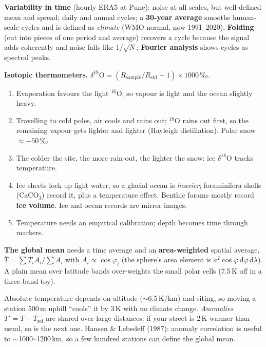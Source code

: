 \textbf{Variability in time} (hourly ERA5 at Pune): noise at all scales, but well-defined mean and spread; daily and annual
cycles; a \textbf{30-year average} smooths human-scale cycles and is defined as \emph{climate} (WMO normal, now 1991--2020).
\textbf{Folding} (cut into pieces of one period and average) recovers a cycle because the signal adds coherently and noise
falls like $1/\sqrt N$; \textbf{Fourier analysis} shows cycles as spectral peaks.

\textbf{Isotopic thermometers.} $\delta^{18}\mathrm O=(R_{\text{sample}}/R_{\text{std}}-1)\times1000$\,‰.
\begin{chain}
\begin{enumerate}
\item Evaporation favours the light $^{16}$O, so vapour is light and the ocean slightly heavy.
\item Travelling to cold poles, air cools and rains out; $^{18}$O rains out first, so the remaining vapour gets lighter and
lighter (Rayleigh distillation). Polar snow $\approx-50$\,‰.
\item The colder the site, the more rain-out, the lighter the snow: ice $\delta^{18}$O tracks temperature.
\item Ice sheets lock up light water, so a glacial ocean is \emph{heavier}; foraminifera shells (CaCO$_3$) record it, plus a
temperature effect. Benthic forams mostly record \textbf{ice volume}. Ice and ocean records are mirror images.
\item Temperature needs an empirical calibration; depth becomes time through markers.
\end{enumerate}
\end{chain}

\textbf{The global mean} needs a time average and an \textbf{area-weighted} spatial average,
$\bar T=\sum T_iA_i/\sum A_i$ with $A_i\propto\cos\varphi_i$ (the sphere's area element is $a^2\cos\varphi\,\mathrm d\varphi\,\mathrm d\lambda$).
A plain mean over latitude bands over-weights the small polar cells (7.5\,K off in a three-band toy).

\begin{chain}
Absolute temperature depends on altitude ($\sim$6.5\,K/km) and siting, so moving a station 500\,m uphill ``cools'' it by 3\,K
with no climate change. \emph{Anomalies} $T'=T-\bar T_{\text{ref}}$ are shared over large distances: if your street is 2\,K
warmer than usual, so is the next one. Hansen \& Lebedeff (1987): anomaly correlation is useful to $\sim$1000--1200\,km, so a
few hundred stations can define the global mean.
\end{chain}

